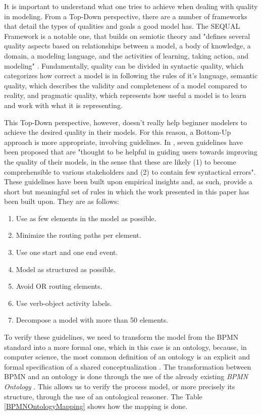 \documentclass{llncs}
\begin{document}
It is important to understand what one tries to achieve when dealing with quality in modeling. From a Top-Down perspective, there are a number of frameworks that detail the types of qualities and goals a good model has. The SEQUAL Framework \cite{Krogstie2006,Lindland1994} is a notable one, that builds on semiotic theory and "defines several quality aspects based on relationships between a model, a body of knowledge, a domain, a modeling language, and the activities of learning, taking action, and modeling" \cite{Mendling2007}. Fundamentally, quality can be divided in syntactic quality, which categorizes how correct a model is in following the rules of it's language, semantic quality, which describes the validity and completeness of a model compared to reality, and pragmatic quality, which represents how useful a model is to learn and work with what it is representing.

This Top-Down perspective, however, doesn't really help beginner modelers to achieve the desired quality in their models. For this reason, a Bottom-Up approach is more appropriate, involving guidelines. In \cite{Mendling2010}, seven guidelines have been proposed that are "thought to be helpful in guiding users towards improving the quality of their models, in the sense that these are likely (1) to become comprehensible to various stakeholders and (2) to contain few syntactical errors". These guidelines have been built upon empirical insights and, as such, provide a short but meaningful set of rules in which the work presented in this paper has been built upon. They are as follows:
\begin{enumerate}
	\item Use as few elements in the model as possible.
	\item Minimize the routing paths per element.
	\item Use one start and one end event.
	\item Model as structured as possible. 
	\item Avoid OR routing elements.
	\item Use verb-object activity labels.
	\item Decompose a model with more than 50 elements.
\end{enumerate}

To verify these guidelines, we  need to transform the model from the BPMN standard into a more formal one, which in this case is an ontology, because, in computer science, the most common definition of an ontology is an explicit and formal specification of a shared conceptualization \cite{borst1997ontology, Gruber1995907, Studer1998161}. The transformation between BPMN and an ontology is done through the use of the already existing \textit{BPMN Ontology} \cite{Rospocher2014foisbpmn}. This allows us to verify the process model, or more precisely its structure, through the use of an ontological reasoner. %
The Table \ref{BPMNOntologyMapping} shows how the mapping is done.
\end{document}
